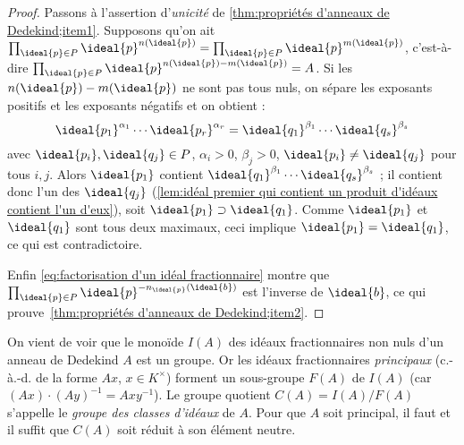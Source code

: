 \documentclass[11pt, useosf,
  title in boldface,
  theorem in new line,
  theorem numbering = section,
  number theorems separately,
]{simplivre}
\begin{document}
\begin{proof}
        Passons à l'assertion d'\emph{unicité} de \ref{thm:propriétés d'anneaux de Dedekind;item1}. Supposons qu'on ait \( \prod_{\ideal{p} \in P} \ideal{p}^{n(\ideal{p})} = \prod_{\ideal{p} \in P} \ideal{p}^{m(\ideal{p})} \), c'est-à-dire \( \prod_{\ideal{p} \in P} \ideal{p}^{n(\ideal{p})-m(\ideal{p})} = A \). Si les \( n(\ideal{p})-m(\ideal{p}) \) ne sont pas tous nuls, on sépare les exposants positifs et les exposants négatifs et on obtient :
        \begin{equation}
            \ideal{p_1}^{\alpha_1} \cdots \ideal{p_r}^{\alpha_r} = \ideal{q_1}^{\beta_1} \cdots \ideal{q_s}^{\beta_s}
        \end{equation}
        avec \( \ideal{p_i}, \ideal{q_j} \in P \), \( \alpha_i > 0 \), \( \beta_j > 0 \), \( \ideal{p_i} \neq \ideal{q_j} \) pour tous \( i,j \). Alors \( \ideal{p_1} \) contient \( \ideal{q_1}^{\beta_1} \cdots \ideal{q_s}^{\beta_s} \) ; il contient donc l'un des \( \ideal{q_j} \) (\cref{lem:idéal premier qui contient un produit d'idéaux contient l'un d'eux}), soit \( \ideal{p_1} \supset \ideal{q_1} \). Comme \( \ideal{p_1} \) et \( \ideal{q_1} \) sont tous deux maximaux, ceci implique \( \ideal{p_1} = \ideal{q_1} \), ce qui est contradictoire.

        Enfin \eqref{eq:factorisation d'un idéal fractionnaire} montre que \( \prod_{\ideal{p} \in P} \ideal{p}^{-n_{\ideal{p}}(\ideal{b})} \) est l'inverse de \( \ideal{b} \), ce qui prouve~\ref{thm:propriétés d'anneaux de Dedekind;item2}.
    \end{proof}

    \begin{remark}
        On vient de voir que le monoïde \( I(A) \) des idéaux fractionnaires non nuls d'un anneau de Dedekind \( A \) est un groupe. Or les idéaux fractionnaires \emph{principaux} (c.-à.-d. de la forme \( Ax \), \( x \in K^\times \)) forment un sous-groupe \( F(A) \) de \( I(A) \) (car \( (Ax)\cdot(Ay)^{-1} = Axy^{-1} \)). Le groupe quotient \( C(A) = I(A) / F(A) \) s'appelle le \emph{groupe des classes d'idéaux} de \( A \). Pour que \( A \) soit principal, il faut et il suffit que \( C(A) \) soit réduit à son élément neutre.
    \end{remark}
\end{document}
